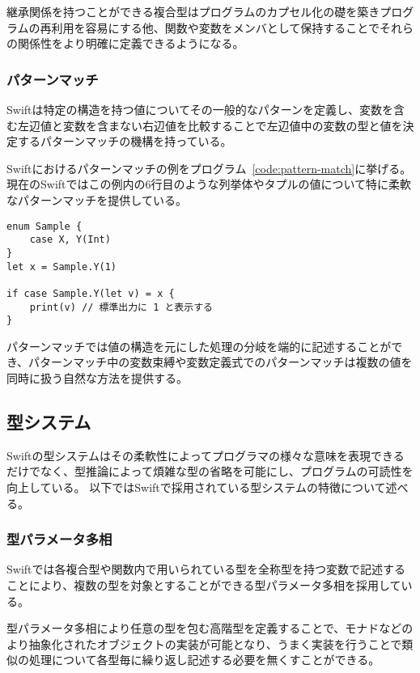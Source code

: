 継承関係を持つことができる複合型はプログラムのカプセル化の礎を築きプログラムの再利用を容易にする他、関数や変数をメンバとして保持することでそれらの関係性をより明確に定義できるようになる。

\subsubsection{パターンマッチ}

Swiftは特定の構造を持つ値についてその一般的なパターンを定義し、変数を含む左辺値と変数を含まない右辺値を比較することで左辺値中の変数の型と値を決定するパターンマッチの機構を持っている。

Swiftにおけるパターンマッチの例をプログラム~\ref{code:pattern-match}に挙げる。
現在のSwiftではこの例内の6行目のような列挙体やタプルの値について特に柔軟なパターンマッチを提供している。

\begin{lstlisting}[caption=Swiftにおけるパターンマッチの例, label=code:pattern-match]
enum Sample {
    case X, Y(Int)
}
let x = Sample.Y(1)

if case Sample.Y(let v) = x {
    print(v) // 標準出力に 1 と表示する
}
\end{lstlisting}

パターンマッチでは値の構造を元にした処理の分岐を端的に記述することができ、パターンマッチ中の変数束縛や変数定義式でのパターンマッチは複数の値を同時に扱う自然な方法を提供する。


\subsection{型システム}

Swiftの型システムはその柔軟性によってプログラマの様々な意味を表現できるだけでなく、型推論によって煩雑な型の省略を可能にし、プログラムの可読性を向上している。
以下ではSwiftで採用されている型システムの特徴について述べる。

\subsubsection{型パラメータ多相}

Swiftでは各複合型や関数内で用いられている型を全称型を持つ変数で記述することにより、複数の型を対象とすることができる型パラメータ多相を採用している。

型パラメータ多相により任意の型を包む高階型を定義することで、モナドなどのより抽象化されたオブジェクトの実装が可能となり、うまく実装を行うことで類似の処理について各型毎に繰り返し記述する必要を無くすことができる。

